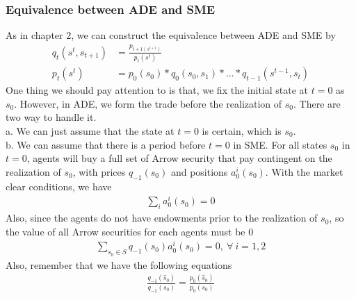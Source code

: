 \documentclass{article}
\begin{document}
\subsubsection{Equivalence between ADE and SME}
As in chapter 2, we can construct the equivalence between ADE and SME by 
\begin{align*}
	q_t(s^t, s_{t+1}) &= \frac{p_{t+1(s^{t+1})}}{p_t(s^t)}\\
	p_t(s^t) &= p_0(s_0) * q_0(s_0, s_1) * \ldots * q_{t-1}(s^{t-1}, s_t)
\end{align*}
One thing we should pay attention to is that, we fix the initial state at $t = 0$ as $s_0$. However, in ADE, we form the trade before the realization of $s_0$. There are two way to handle it.\\
\indent a. We can just assume that the state at $t = 0$ is certain, which is $s_0$.\\
\indent b. We can assume that there is a period before $t = 0$ in SME. For all states $s_0$ in $t = 0$, agents will buy a full set of Arrow security that pay contingent on the realization of $s_0$, with prices $q_{-1}(s_0)$ and positions $a^i_0(s_0)$. With the market clear conditions, we have
\begin{align*}
	\sum\limits_i a^i_0(s_0) = 0
\end{align*}
\indent Also, since the agents do not have endowments prior to the realization of $s_0$, so the value of all Arrow securities for each agents must be 0
\begin{align*}
	\sum\limits_{s_0 \in S} q_{-1}(s_0) a^i_0(s_0) = 0,\ \forall\ i = 1, 2
\end{align*}
\indent Also, remember that we have the following equations
\begin{align*}
	\frac{q_{-1}(\hat{s}_0)}{q_{-1}(s_0)} = \frac{p_0(\hat{s}_0)}{p_0(s_0)}
\end{align*}
\end{document}
